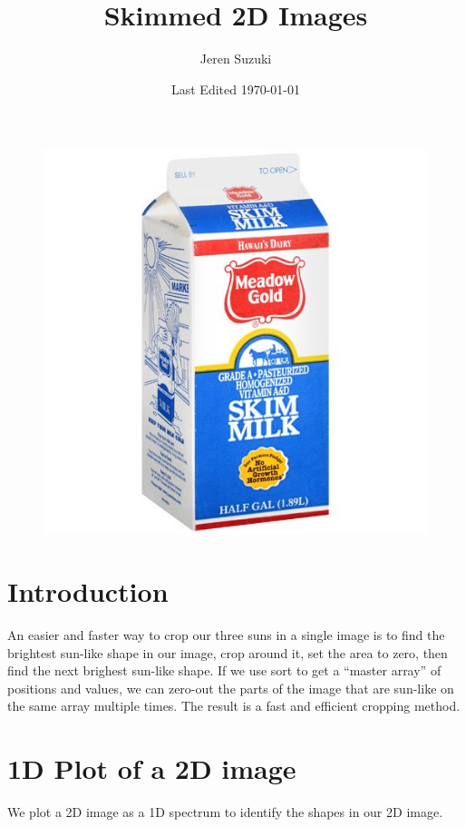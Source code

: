 \documentclass[10pt]{article}
\title{Skimmed 2D Images}
\author{Jeren Suzuki}
\date{Last Edited \today}
\begin{document}
\maketitle

\begin{figure}[!ht]
    \centering
    \includegraphics[width=.9\textwidth]{plots_tables_images/skimmilk.jpg}    
\end{figure}

\tableofcontents
\newpage
{}

\section{Introduction} %
\label{sec:introduction}
An easier and faster way to crop our three suns in a single image is to find the brightest sun-like shape in our image, crop around it, set the area to zero, then find the next brighest sun-like shape. If we use sort to get a ``master array'' of positions and values, we can zero-out the parts of the image that are sun-like on the same array multiple times. The result is a fast and efficient cropping method.


\section{1D Plot of a 2D image} %
\label{sec:1d_plot_of_a_2d_image}
We plot a 2D image as a 1D spectrum to identify the shapes in our 2D image.
\end{document}
